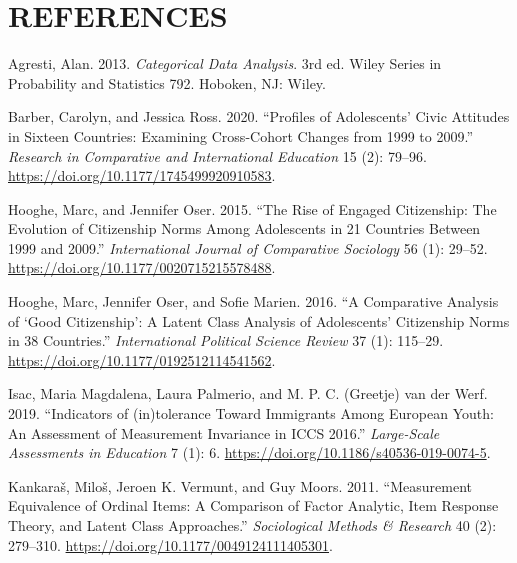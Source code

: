 \documentclass[
      11pt,
                      ]{article}
\begin{document}
\newpage

\hypertarget{references}{%
\section*{REFERENCES}\label{references}}

\hypertarget{refs}{}
\begin{CSLReferences}{1}{0}
\leavevmode\hypertarget{ref-agresti_categorical_2013}{}%
Agresti, Alan. 2013. \emph{Categorical Data Analysis}. 3rd ed. Wiley
Series in Probability and Statistics 792. Hoboken, NJ: Wiley.

\leavevmode\hypertarget{ref-barber_profiles_2020}{}%
Barber, Carolyn, and Jessica Ross. 2020. {``Profiles of Adolescents'
Civic Attitudes in Sixteen Countries: {Examining} Cross-Cohort Changes
from 1999 to 2009.''} \emph{Research in Comparative and International
Education} 15 (2): 79--96.
\url{https://doi.org/10.1177/1745499920910583}.

\leavevmode\hypertarget{ref-hooghe_rise_2015}{}%
Hooghe, Marc, and Jennifer Oser. 2015. {``The Rise of Engaged
Citizenship: {The} Evolution of Citizenship Norms Among Adolescents in
21 Countries Between 1999 and 2009.''} \emph{International Journal of
Comparative Sociology} 56 (1): 29--52.
\url{https://doi.org/10.1177/0020715215578488}.

\leavevmode\hypertarget{ref-hooghe_comparative_2016}{}%
Hooghe, Marc, Jennifer Oser, and Sofie Marien. 2016. {``A Comparative
Analysis of {`Good Citizenship'}: {A} Latent Class Analysis of
Adolescents' Citizenship Norms in 38 Countries.''} \emph{International
Political Science Review} 37 (1): 115--29.
\url{https://doi.org/10.1177/0192512114541562}.

\leavevmode\hypertarget{ref-isac_indicators_2019}{}%
Isac, Maria Magdalena, Laura Palmerio, and M. P. C. (Greetje) van der
Werf. 2019. {``Indicators of (in)tolerance Toward Immigrants Among
{European} Youth: An Assessment of Measurement Invariance in {ICCS}
2016.''} \emph{Large-Scale Assessments in Education} 7 (1): 6.
\url{https://doi.org/10.1186/s40536-019-0074-5}.

\leavevmode\hypertarget{ref-kankaras_measurement_2011}{}%
Kankaraš, Miloš, Jeroen K. Vermunt, and Guy Moors. 2011. {``Measurement
{Equivalence} of {Ordinal} {Items}: {A} {Comparison} of {Factor}
{Analytic}, {Item} {Response} {Theory}, and {Latent} {Class}
{Approaches}.''} \emph{Sociological Methods \& Research} 40 (2):
279--310. \url{https://doi.org/10.1177/0049124111405301}.


\end{CSLReferences}
\end{document}
